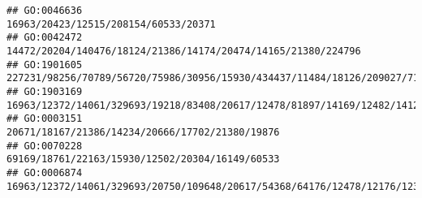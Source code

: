 \documentclass[
]{article}
\begin{document}
\begin{verbatim}
## GO:0046636                                                                                                                                                                                                                                                                                                                                                                         16963/20423/12515/208154/60533/20371
## GO:0042472                                                                                                                                                                                                                                                                                                                                                14472/20204/140476/18124/21386/14174/20474/14165/21380/224796
## GO:1901605                                                                                                                                                                                                                                                                                                                       227231/98256/70789/56720/75986/30956/15930/434437/11484/18126/209027/71275/11720/17986
## GO:1903169                                                                                                                                                                                                                                                                                                                               16963/12372/14061/329693/19218/83408/20617/12478/81897/14169/12482/14126/12766
## GO:0003151                                                                                                                                                                                                                                                                                                                                                              20671/18167/21386/14234/20666/17702/21380/19876
## GO:0070228                                                                                                                                                                                                                                                                                                                                                              69169/18761/22163/15930/12502/20304/16149/60533
## GO:0006874                                                                                                                                                                                                                                                                                         16963/12372/14061/329693/20750/109648/20617/54368/64176/12478/12176/12308/23832/20307/20304/214189/22337/14126/12766

\end{verbatim}
\end{document}
